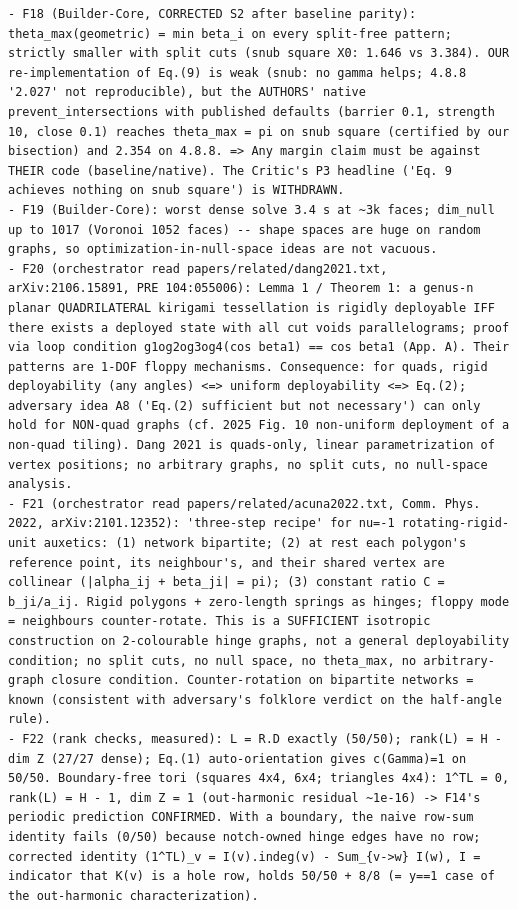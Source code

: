 \documentclass[10pt,a4paper]{article}
\begin{document}
\begin{lstlisting}
- F18 (Builder-Core, CORRECTED S2 after baseline parity): theta_max(geometric) = min beta_i on every split-free pattern; strictly smaller with split cuts (snub square X0: 1.646 vs 3.384). OUR re-implementation of Eq.(9) is weak (snub: no gamma helps; 4.8.8 '2.027' not reproducible), but the AUTHORS' native prevent_intersections with published defaults (barrier 0.1, strength 10, close 0.1) reaches theta_max = pi on snub square (certified by our bisection) and 2.354 on 4.8.8. => Any margin claim must be against THEIR code (baseline/native). The Critic's P3 headline ('Eq. 9 achieves nothing on snub square') is WITHDRAWN.
- F19 (Builder-Core): worst dense solve 3.4 s at ~3k faces; dim_null up to 1017 (Voronoi 1052 faces) -- shape spaces are huge on random graphs, so optimization-in-null-space ideas are not vacuous.
- F20 (orchestrator read papers/related/dang2021.txt, arXiv:2106.15891, PRE 104:055006): Lemma 1 / Theorem 1: a genus-n planar QUADRILATERAL kirigami tessellation is rigidly deployable IFF there exists a deployed state with all cut voids parallelograms; proof via loop condition g1og2og3og4(cos beta1) == cos beta1 (App. A). Their patterns are 1-DOF floppy mechanisms. Consequence: for quads, rigid deployability (any angles) <=> uniform deployability <=> Eq.(2); adversary idea A8 ('Eq.(2) sufficient but not necessary') can only hold for NON-quad graphs (cf. 2025 Fig. 10 non-uniform deployment of a non-quad tiling). Dang 2021 is quads-only, linear parametrization of vertex positions; no arbitrary graphs, no split cuts, no null-space analysis.
- F21 (orchestrator read papers/related/acuna2022.txt, Comm. Phys. 2022, arXiv:2101.12352): 'three-step recipe' for nu=-1 rotating-rigid-unit auxetics: (1) network bipartite; (2) at rest each polygon's reference point, its neighbour's, and their shared vertex are collinear (|alpha_ij + beta_ji| = pi); (3) constant ratio C = b_ji/a_ij. Rigid polygons + zero-length springs as hinges; floppy mode = neighbours counter-rotate. This is a SUFFICIENT isotropic construction on 2-colourable hinge graphs, not a general deployability condition; no split cuts, no null space, no theta_max, no arbitrary-graph closure condition. Counter-rotation on bipartite networks = known (consistent with adversary's folklore verdict on the half-angle rule).
- F22 (rank checks, measured): L = R.D exactly (50/50); rank(L) = H - dim Z (27/27 dense); Eq.(1) auto-orientation gives c(Gamma)=1 on 50/50. Boundary-free tori (squares 4x4, 6x4; triangles 4x4): 1^TL = 0, rank(L) = H - 1, dim Z = 1 (out-harmonic residual ~1e-16) -> F14's periodic prediction CONFIRMED. With a boundary, the naive row-sum identity fails (0/50) because notch-owned hinge edges have no row; corrected identity (1^TL)_v = I(v).indeg(v) - Sum_{v->w} I(w), I = indicator that K(v) is a hole row, holds 50/50 + 8/8 (= y==1 case of the out-harmonic characterization).

\end{lstlisting}
\end{document}
